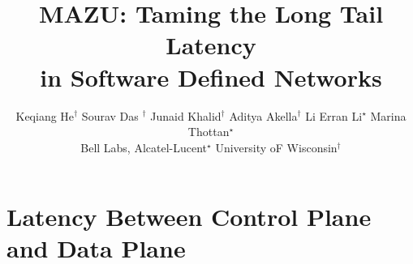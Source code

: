 \documentclass[onecolumn]{sig-alternate-10pt-onecolumn}
\title{MAZU: Taming the Long Tail Latency \\in Software Defined Networks}
\author{
Keqiang He$^\dagger$ \hspace{0.02in} 
Sourav Das $^\dagger$ \hspace{0.02in} 
Junaid Khalid$^\dagger$ \hspace{0.02in} 
Aditya Akella$^\dagger$ \hspace{0.02in} 
Li Erran Li$^\star$ \hspace{0.02in} 
Marina Thottan$^\star$ \hspace{0.02in} \\
Bell Labs, Alcatel-Lucent$^\star$ \hspace{0.1in}
University oF Wisconsin$^\dagger$ \hspace{0.1in}
}
\begin{document}
\maketitle

\vspace{-0.7in}
\section{Latency Between Control Plane and Data Plane}
\label{sec:intro}
\end{document}
